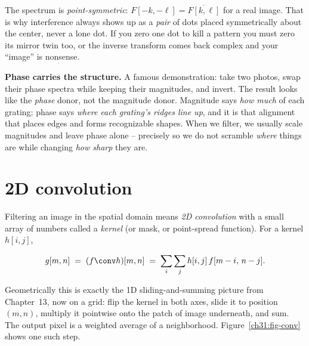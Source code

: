 \begin{trapbox}
The spectrum is \emph{point-symmetric}: $F[-k,-\ell] = \overline{F[k,\ell]}$ for a
real image. That is why interference always shows up as a \emph{pair} of dots
placed symmetrically about the center, never a lone dot. If you zero one dot to
kill a pattern you must zero its mirror twin too, or the inverse transform comes
back complex and your ``image'' is nonsense.
\end{trapbox}

\begin{whybox}
\textbf{Phase carries the structure.} A famous demonstration: take two photos,
swap their phase spectra while keeping their magnitudes, and invert. The result
looks like the \emph{phase} donor, not the magnitude donor. Magnitude says
\emph{how much} of each grating; phase says \emph{where each grating's ridges
line up}, and it is that alignment that places edges and forms recognizable shapes.
When we filter, we usually scale magnitudes and leave phase alone -- precisely so we
do not scramble \emph{where} things are while changing \emph{how sharp} they are.
\end{whybox}

\section{2D convolution}
\label{ch31:conv}

Filtering an image in the spatial domain means \emph{2D convolution} with a small
array of numbers called a \emph{kernel} (or mask, or point-spread function). For a
kernel $h[i,j]$,

\begin{equation}
g[m,n] \;=\; (f \conv h)[m,n] \;=\;
\sum_{i}\sum_{j} h[i,j]\, f[m-i,\,n-j].
\label{ch31:conv2d}
\end{equation}

Geometrically this is exactly the 1D sliding-and-summing picture from
Chapter~13, now on a grid: flip the kernel in both axes, slide it to position
$(m,n)$, multiply it pointwise onto the patch of image underneath, and sum. The
output pixel is a weighted average of a neighborhood.
Figure~\ref{ch31:fig-conv} shows one such step.

